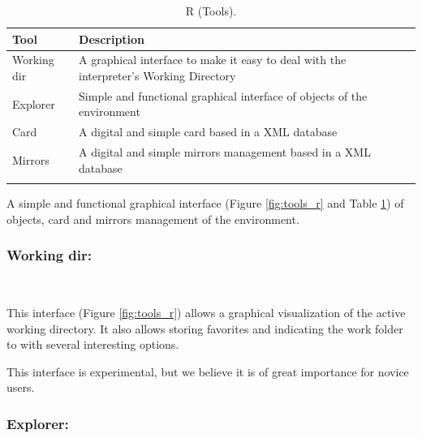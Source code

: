 
\begin{table}
  \begin{footnotesize}
    \begin{tabularx}{\textwidth}{>{\hsize=0.3\hsize}X>{\hsize=0.7\hsize}X}\\
      \hline
      \textbf{Tool} & \textbf{Description} \\
      \hline
      Working dir & A graphical interface to make it easy to deal with the \RR{} interpreter's Working Directory \\
      Explorer & Simple and functional graphical interface of objects of the \RR{} environment \\
      Card & A digital and simple \RR{} card based in a XML database \\
      Mirrors & A digital and simple \RR{} mirrors management based in a XML database \\
      \hline
      \\
    \end{tabularx}
  \end{footnotesize}
  \caption{R (Tools).}
  \label{tab:tools_r}
\end{table}

A simple and functional graphical interface
(Figure \ref{fig:tools_r} and
Table \ref{tab:tools_r})
of objects, card and mirrors management of the \RR{} environment.


\subsubsection{Working dir:}\\

This interface
(Figure \ref{fig:tools_r})
allows a graphical visualization of the active \RR{} working directory. It also
allows storing favorites and indicating the work folder to \RR{} with
several interesting options.

This interface is experimental, but we believe it is of great importance for novice users.


\subsubsection{Explorer:}\\

